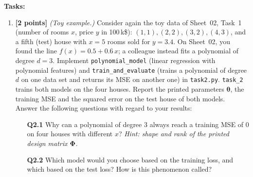 \documentclass[hidelinks,10pt]{article}
\providecommand{\tth}{\bm{\theta}}
\begin{document}
\textbf{Tasks:}
\begin{enumerate}
    \item \textbf{[2 points]} \emph{(Toy example.)} Consider again the toy data of Sheet~02, Task~1 (number of rooms $x$, price $y$ in 100\,k\$): $(1, 1), (2, 2), (3, 2), (4, 3)$, and a fifth (test) house with $x = 5$ rooms sold for $y = 3.4$. On Sheet~02, you found the line $f(x) = 0.5 + 0.6\,x$; a colleague instead fits a polynomial of degree $d = 3$. Implement \texttt{polynomial\_model} (linear regression with polynomial features) and \texttt{train\_and\_evaluate} (trains a polynomial of degree $d$ on one data set and returns its MSE on another one) in \texttt{task2.py}. \texttt{task\_2} trains both models on the four houses. Report the printed parameters $\tth$, the training MSE and the squared error on the test house of both models. Answer the following questions with regard to your results:
    \begin{itemize}
        \item[\textbf{Q2.1}] Why can a polynomial of degree $3$ always reach a training MSE of $0$ on four houses with different $x$? \emph{Hint: shape and rank of the printed design matrix $\bm{\Phi}$.}
        \item[\textbf{Q2.2}] Which model would you choose based on the training loss, and which based on the test loss? How is this phenomenon called?
    \end{itemize}


\end{enumerate}
\end{document}
